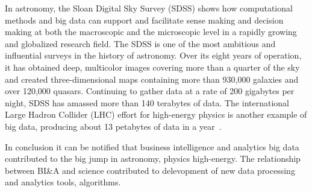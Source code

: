 In astronomy, the Sloan Digital Sky Survey (SDSS) shows
how computational methods and big data can support and
facilitate sense making and decision making at both the
macroscopic and the microscopic level in a rapidly growing
and globalized research field. The SDSS is one of the most
ambitious and influential surveys in the history of astronomy.
Over its eight years of operation, it has obtained deep, multicolor
images covering more than a quarter of the sky and
created three-dimensional maps containing more than 930,000
galaxies and over 120,000 quasars. Continuing to gather data
at a rate of 200 gigabytes per night, SDSS has amassed more
than 140 terabytes of data. The international Large Hadron
Collider (LHC) effort for high-energy physics is another
example of big data, producing about 13 petabytes of data in
a year~\cite{Brantingham:2011}.

In conclusion it can be notified that business intelligence and analytics big data contributed to the big jump in astronomy, physics  high-energy. The relationship between BI\&A and science contributed to delevopment of new data processing and analytics tools, algorithms.